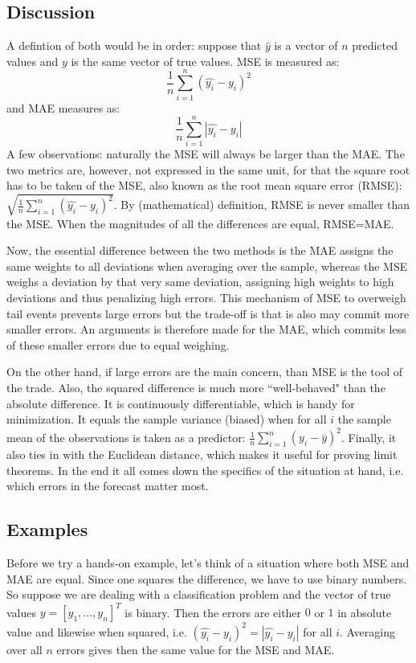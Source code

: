 \documentclass[english, a4paper]{article}
\begin{document}
\subsection{Discussion}
A defintion of both would be in order: suppose that $\hat{y}$ is a vector of $n$ predicted values and $y$ is the same vector of true values. MSE is measured as:
$$
\frac{1}{n}\sum_{i=1}^{n}(\hat{y_{i}} - y_{i})^{2}
$$  
and MAE measures as:
$$
\frac{1}{n}\sum_{i=1}^{n}|\hat{y_{i}}-y_{i}|
$$
A few observations: naturally the MSE will always be larger than the MAE. The two metrics are, however, not expressed in the same unit, for that the square root has to be taken of the MSE, also known as the root mean square error (RMSE): $ \sqrt{\frac{1}{n}\sum_{i=1}^{n}(\hat{y_{i}} - y_{i})^{2}}$. By (mathematical) definition, RMSE is never smaller than the MSE. When the magnitudes of all the differences are equal, RMSE=MAE. 

Now, the essential difference between the two methods is the MAE assigns the same weights to all deviations when averaging over the sample, whereas the MSE weighs a deviation by that very same deviation, assigning high weights to high deviations and thus penalizing high errors. This mechanism of MSE to overweigh tail events prevents large errors but the trade-off is that is also may commit more smaller errors. An arguments is therefore made for the MAE, which commits less of these smaller errors due to equal weighing.

On the other hand, if large errors are the main concern, than MSE is the tool of the trade. Also, the squared difference is much more ``well-behaved" than the absolute difference. It is continuously differentiable, which is handy for minimization. It equals the sample variance (biased) when for all $i$ the sample mean of the observations is taken as a predictor: $\frac{1}{n}\sum_{i=1}^{n}( y_{i} - \bar{y})^{2}$. Finally, it also ties in with the Euclidean distance, which makes it useful for proving limit theorems. In the end it all comes down the specifics of the situation at hand, i.e. which errors in the forecast matter most.

\subsection{Examples}
Before we try a hands-on example, let's think of a situation where both MSE and MAE are equal. Since one squares the difference, we have to use binary numbers. So suppose we are dealing with a classification problem and the vector of true values $y=[y_{1},\dots,y_{n}]^{T}$ is binary. Then the errors are either $0$ or $1$ in absolute value and likewise when squared, i.e. $(\hat{y_{i}} - y_{i})^{2}=|\hat{y_{i}}-y_{i}|$ for all $i$. Averaging over all $n$ errors gives then the same value for the MSE and MAE.

 
  

          


\end{document}
